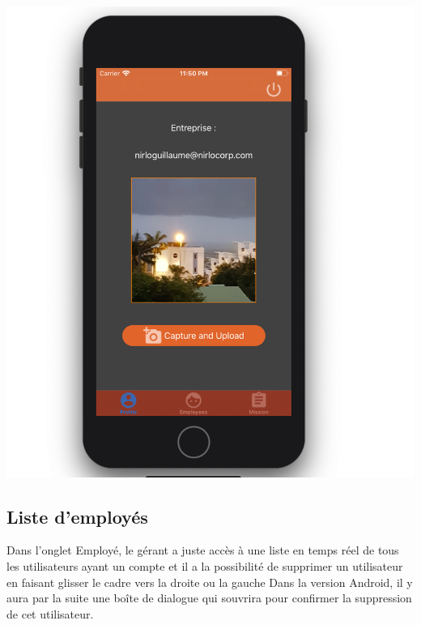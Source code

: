 \documentclass{article}
\begin{document}
\begin{center}
    \includegraphics[scale=0.15]{profilIOS.png}
\end{center}

\newpage

\subsection{ Liste d'employés}

Dans l'onglet Employé, le gérant a juste accès à une liste en temps réel de tous les utilisateurs ayant un compte et il a la possibilité de supprimer un utilisateur en faisant glisser le cadre vers la droite ou la gauche Dans la version Android, il y aura par la suite une boîte de dialogue qui souvrira pour confirmer la suppression de cet utilisateur.
\end{document}
